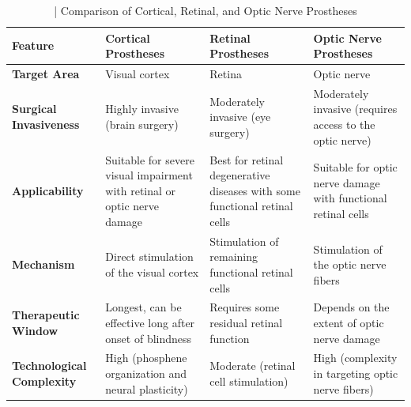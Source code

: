 \documentclass[twocolumn,10pt]{article}
\begin{document}
\begin{table}[ht!]
      \centering
      \fontsize{8pt}{10pt}\selectfont
      \caption{| Comparison of Cortical, Retinal, and Optic Nerve Prostheses}\label{tab:prostheses_comparison}
      \begin{tabularx}{\textwidth}{X X X X}
            \hline
            \textbf{Feature}                             & \textbf{Cortical Prostheses}                                                        & \textbf{Retinal Prostheses}                                                    & \textbf{Optic Nerve Prostheses}                                 \\ \hline
            \textbf{Target Area}                         & Visual cortex                                                                       & Retina                                                                         & Optic nerve                                                     \\ \hline
            \textbf{Surgical \newline Invasiveness}      & Highly invasive (brain surgery)                                                     & Moderately invasive (eye surgery)                                              & Moderately invasive (requires access to the optic nerve)        \\ \hline
            \textbf{Applicability}                       & Suitable for severe visual impairment with retinal or optic nerve damage            & Best for retinal degenerative diseases with some functional retinal cells      & Suitable for optic nerve damage with functional retinal cells   \\ \hline
            \textbf{Mechanism}                           & Direct stimulation of the visual cortex                                             & Stimulation of remaining functional retinal cells                              & Stimulation of the optic nerve fibers                           \\ \hline
            \textbf{Therapeutic \newline Window}         & Longest, can be effective long after onset of blindness                             & Requires some residual retinal function                                        & Depends on the extent of optic nerve damage                     \\ \hline
            \textbf{Technological \newline Complexity}   & High (phosphene organization and neural plasticity)                                 & Moderate (retinal cell stimulation)                                            & High (complexity in targeting optic nerve fibers)               \\ \hline

\end{tabularx}
\end{table}
\end{document}
